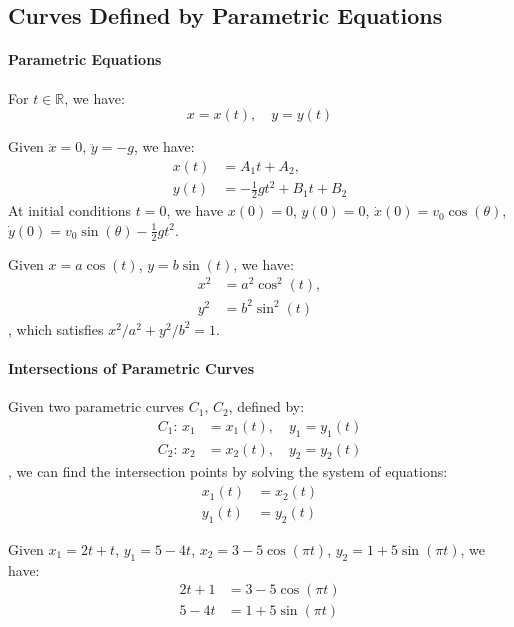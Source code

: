 \documentclass[11pt]{report}
\begin{document}
\subsection{Curves Defined by Parametric Equations}
\paragraph{Parametric Equations} For $t \in \mathbb{R}$, we have:
\begin{equation}
    x = x(t), \quad y = y(t)
\end{equation}
\begin{example}
    Given $\ddot{x} = 0$, $\ddot{y} = -g$, we have:
    \begin{align*}
        x(t) &= A_1 t + A_2, \\
        y(t) &= -\frac{1}{2}gt^2 + B_1 t + B_2
    \end{align*}
    At initial conditions $t = 0$, we have $x(0) = 0$, $y(0) = 0$, $\dot x(0) = v_0 \cos(\theta)$, $\dot y(0) = v_0 \sin(\theta) - \frac{1}{2}gt^2$.
\end{example}
\begin{example}[Ellipse]
    Given $x = a\cos(t)$, $y = b\sin(t)$, we have:
    \begin{align*}
        x^2 &= a^2\cos^2(t), \\
        y^2 &= b^2\sin^2(t)
    \end{align*}
    , which satisfies $x^2/a^2 + y^2/b^2 = 1$.
\end{example}
\paragraph{Intersections of Parametric Curves} Given two parametric curves $C_1,\,C_2$, defined by:
\begin{align*}
    C_1:\, x_1 &= x_1(t), \quad y_1 = y_1(t) \\
    C_2:\, x_2 &= x_2(t), \quad y_2 = y_2(t)
\end{align*}
, we can find the intersection points by solving the system of equations:
\begin{align*}
    x_1(t) &= x_2(t) \\
    y_1(t) &= y_2(t)
\end{align*}
\begin{example}
    Given $x_1 = 2t+t$, $y_1 = 5-4t$, $x_2 = 3 - 5\cos(\pi t)$, $y_2 = 1 + 5\sin(\pi t)$, we have:
    \begin{align*}
        2t + 1 &= 3 - 5\cos(\pi t) \\
        5 - 4t &= 1 + 5\sin(\pi t)
    \end{align*}
\end{example}
\end{document}
